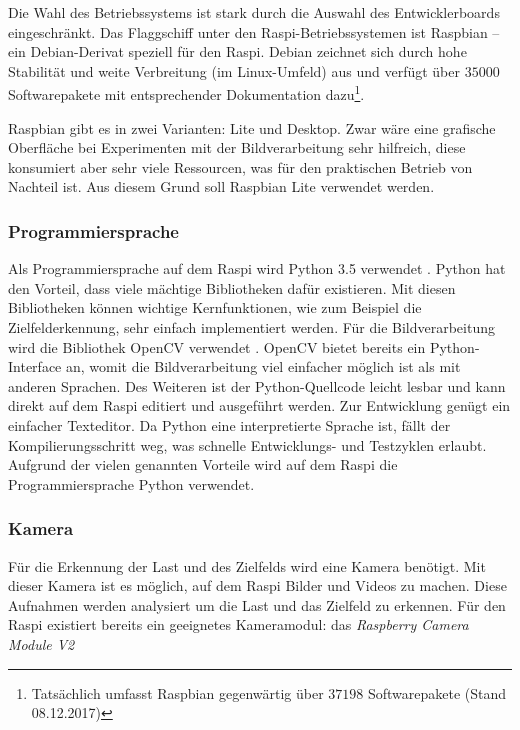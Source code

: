 Die Wahl des Betriebssystems ist stark durch die Auswahl des Entwicklerboards eingeschränkt. Das Flaggschiff unter den Raspi-Betriebssystemen ist Raspbian -- ein Debian-Derivat speziell für den Raspi. Debian zeichnet sich durch hohe Stabilität und weite Verbreitung (im Linux-Umfeld) aus und verfügt über $35000$ Softwarepakete  mit entsprechender Dokumentation dazu\footnote{Tatsächlich umfasst Raspbian gegenwärtig über $37198$ Softwarepakete (Stand 08.12.2017)}.

Raspbian gibt es in zwei Varianten: Lite und Desktop. Zwar wäre eine grafische Oberfläche bei Experimenten mit der Bildverarbeitung sehr hilfreich, diese konsumiert aber sehr viele Ressourcen, was für den praktischen Betrieb von Nachteil ist. Aus diesem Grund soll Raspbian Lite verwendet werden.


\subsubsection{Programmiersprache}

Als Programmiersprache auf dem Raspi wird Python 3.5 verwendet . Python hat den Vorteil, dass viele mächtige Bibliotheken dafür existieren. Mit diesen Bibliotheken können wichtige Kernfunktionen, wie zum Beispiel die Zielfelderkennung, sehr einfach implementiert werden. Für die Bildverarbeitung wird die Bibliothek OpenCV verwendet . OpenCV bietet bereits ein Python-Interface an, womit die Bildverarbeitung viel einfacher möglich ist als mit anderen Sprachen. Des Weiteren ist der Python-Quellcode leicht lesbar und kann direkt auf dem Raspi editiert und ausgeführt werden. Zur Entwicklung genügt ein einfacher Texteditor. Da Python eine interpretierte Sprache ist, fällt der Kompilierungsschritt weg, was schnelle Entwicklungs- und Testzyklen erlaubt. Aufgrund der vielen genannten Vorteile wird auf dem Raspi die Programmiersprache Python verwendet.

\subsubsection{Kamera}
\label{sec:kamera}

Für die Erkennung der Last und des Zielfelds wird eine Kamera benötigt. Mit dieser Kamera ist es möglich, auf dem Raspi Bilder und Videos zu machen. Diese Aufnahmen werden analysiert um die Last und das Zielfeld zu erkennen. Für den Raspi existiert bereits ein geeignetes Kameramodul: das \textit{Raspberry Camera Module V2}  

